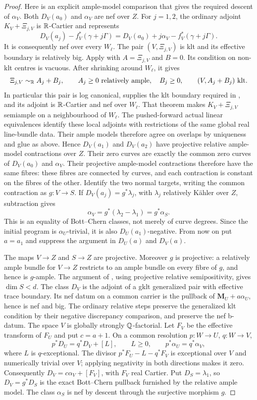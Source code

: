 \begin{proof}
Here is an explicit ample-model comparison that gives the required
descent of $\alpha_V$. Both $D_V(a_0)$ and $\alpha_V$ are nef over
$Z$. For $j=1,2$, the ordinary adjoint $K_V+\Xi_{j,V}$ is
$\mathbb R$-Cartier and represents
\[
 D_V(a_j)-f_V^*(\gamma+j\Gamma)
   =D_V(a_0)+j\alpha_V-f_V^*(\gamma+j\Gamma).
\]
It is consequently nef over every $W_\ell$. The pair
$(V,\Xi_{j,V})$ is klt and its effective boundary is relatively
big. Apply \cite[Lemma~11.15]{Fujino2022} with
$A=\Xi_{j,V}$ and $B=0$. Its condition on non-klt centres is
vacuous. After shrinking around $W_\ell$, it gives
\[
 \Xi_{j,V}\sim_{\mathbb R}A_j+B_j,\qquad
 A_j\geq0\ \text{relatively ample},\quad B_j\geq0,
 \qquad (V,A_j+B_j)\ \text{klt}.
\]
In particular this pair is log canonical, supplies the klt boundary
required in \cite[Theorem~8.3]{Fujino2022}, and its adjoint is
$\mathbb R$-Cartier and nef over $W_\ell$. That theorem makes
$K_V+\Xi_{j,V}$ semiample on a neighbourhood of $W_\ell$.
The pushed-forward actual linear equivalences identify these local
adjoints with restrictions of the same global real line-bundle
data. Their ample models therefore agree on overlaps by uniqueness
and glue as above. Hence $D_V(a_1)$ and $D_V(a_2)$ have projective
relative ample-model contractions over $Z$. Their zero curves are exactly the common zero
curves of $D_V(a_0)$ and $\alpha_V$. Their projective ample-model
contractions therefore have the same fibres: these fibres are
connected by curves, and each contraction is constant on the
fibres of the other. Identify the two normal targets, writing the
common contraction as $g:V\to S$. If
$D_V(a_j)=g^*\lambda_j$, with $\lambda_j$ relatively K\"ahler over
$Z$, subtraction gives
\[
 \alpha_V=g^*(\lambda_2-\lambda_1)=g^*\alpha_S.
\]
This is an equality of Bott--Chern classes, not merely of curve
degrees. Since the initial program is $\alpha_U$-trivial, it is
also $D_U(a_1)$-negative. From now on put $a=a_1$ and suppress
the argument in $D_U(a)$ and $D_V(a)$.

The maps $V\to Z$ and $S\to Z$ are projective. Moreover $g$ is
projective: a relatively ample bundle for $V\to Z$ restricts to
an ample bundle on every fibre of $g$, and hence is $g$-ample.
The argument of \cite[Theorem~4.1, Claim~4.2]{HX2026}, using
projective relative semipositivity, gives $\dim S<d$.
The class $D_V$ is the adjoint of a gklt generalized pair with
effective trace boundary. Its nef datum on a common carrier is the
pullback of $\mathbf M_U+a\alpha_U$, hence is nef and big.
The ordinary relative steps preserve the generalized klt condition
by their negative discrepancy comparison, and preserve the nef
b-datum. The space $V$ is globally strongly $\mathbb Q$-factorial.
Let $F_V$ be the effective transform of $F_U$ and put $c=a+1$.
On a common resolution $p:W\to U$, $q:W\to V$,
\[
 p^*D_U=q^*D_V+[L],\qquad L\geq0,
 \qquad p^*\alpha_U=q^*\alpha_V,
\]
where $L$ is $q$-exceptional. The divisor
$p^*F_U-L-q^*F_V$ is exceptional over $V$ and numerically trivial
over $V$; applying negativity in both directions makes it zero.
Consequently $D_V=c\alpha_V+[F_V]$, with $F_V$ real Cartier.
Put $D_S=\lambda_1$, so $D_V=g^*D_S$ is the exact Bott--Chern
pullback furnished by the relative ample model. The class
$\alpha_S$ is nef by descent through the surjective morphism $g$.


\end{proof}
